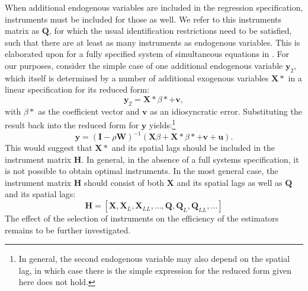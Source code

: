 \documentclass{article}
\begin{document}
When additional endogenous variables are included in the regression specification,
instruments must be included for those as well. We refer to this instruments
matrix as $\mathbf{Q}$, for which the usual identification restrictions need to be
satisfied, such that there are at least as many instruments as endogenous
variables. 
This is elaborated upon for a fully specified system of simultaneous equations
in \cite{KelejianPrucha:04}. For our purposes, 
consider the simple case of one additional endogenous variable $\mathbf{y}_2$,
which itself is determined by a number of additional exogenous variables $\mathbf{X*}$ in
a linear specification for its reduced form:
\begin{equation*}
 \mathbf{y}_2 = \mathbf{X*} \beta* + \mathbf{v},
\end{equation*}
with $\beta*$ as the coefficient vector and $\mathbf{v}$ as an idiosyncratic error.
Substituting the result back into the reduced form for $\mathbf{y}$ yields:\footnote{In 
general, the second endogenous variable may also depend on the spatial lag, in
which case there is the simple expression for the reduced form given here does
not hold.}
\begin{equation*}
 \mathbf{y} = (\mathbf{I} - \rho \mathbf{W} )^{-1} (\mathbf{X}\beta + \mathbf{X*} \beta* + \mathbf{v} + \mathbf{u}).
\end{equation*}
This would suggest that $\mathbf{X*}$ and its spatial lags should be included
in the instrument matrix $\mathbf{H}$. In general, in the absence of a full systems
specification, it is not possible to obtain optimal instruments. In the most general
case, the instrument matrix $\mathbf{H}$ should consist of both $\mathbf{X}$ and
its spatial lags as well as $\mathbf{Q}$ and its spatial lags:
\begin{equation*}
 \mathbf{H} = [ \mathbf{X}, \mathbf{X}_L, \mathbf{X}_{LL}, \dots, \mathbf{Q}, \mathbf{Q}_L, \mathbf{Q}_{LL}, \dots ]
\end{equation*}
The effect of the selection of instruments on the efficiency of the estimators
remains to be further investigated.
\end{document}
